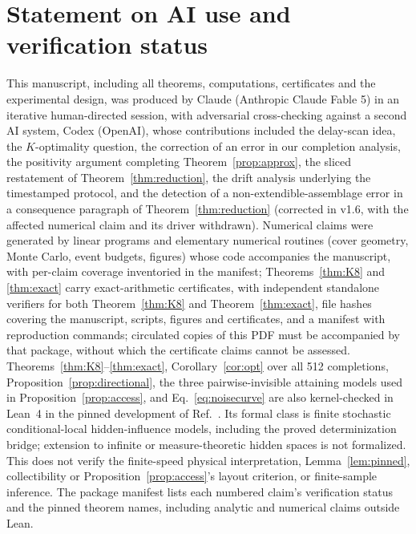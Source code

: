 \documentclass[10pt,twocolumn]{article}
\begin{document}
\section*{Statement on AI use and verification status}
This manuscript, including all theorems, computations, certificates and the experimental design, was produced by Claude (Anthropic Claude Fable 5) in an iterative human-directed session, with adversarial cross-checking against a second AI system, Codex (OpenAI), whose contributions included the delay-scan idea, the $K$-optimality question, the correction of an error in our completion analysis, the positivity argument completing Theorem~\ref{prop:approx}, the sliced restatement of Theorem~\ref{thm:reduction}, the drift analysis underlying the timestamped protocol, and the detection of a non-extendible-assemblage error in a consequence paragraph of Theorem~\ref{thm:reduction} (corrected in v1.6, with the affected numerical claim and its driver withdrawn). Numerical claims were generated by linear programs and elementary numerical routines (cover geometry, Monte Carlo, event budgets, figures) whose code accompanies the manuscript, with per-claim coverage inventoried in the manifest; Theorems~\ref{thm:K8} and \ref{thm:exact} carry exact-arithmetic certificates, with independent standalone verifiers for both Theorem~\ref{thm:K8} and Theorem~\ref{thm:exact}, file hashes covering the manuscript, scripts, figures and certificates, and a manifest with reproduction commands; circulated copies of this PDF must be accompanied by that package, without which the certificate claims cannot be assessed. Theorems~\ref{thm:K8}--\ref{thm:exact}, Corollary~\ref{cor:opt}
over all 512 completions, Proposition~\ref{prop:directional}, the three
pairwise-invisible attaining models used in Proposition~\ref{prop:access},
and Eq.~\eqref{eq:noisecurve} are also kernel-checked in Lean~4 in the
pinned development of Ref.~\cite{LeanVerification}. Its formal class is
finite stochastic conditional-local hidden-influence models, including the
proved determinization bridge; extension to infinite or measure-theoretic
hidden spaces is not formalized. This does not verify the finite-speed
physical interpretation, Lemma~\ref{lem:pinned}, collectibility or
Proposition~\ref{prop:access}'s layout criterion, or finite-sample inference.
The package manifest lists each numbered claim's verification status and the
pinned theorem names, including analytic and numerical claims outside Lean.
\end{document}
